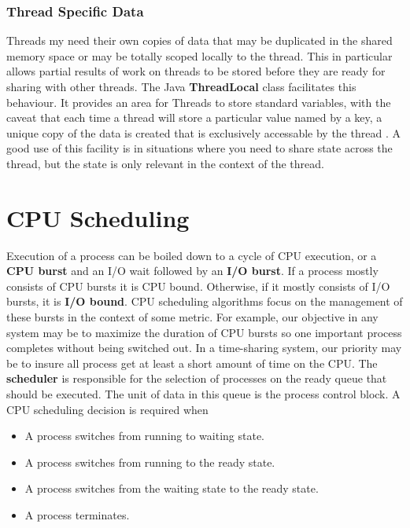 \documentclass[10pt,a4paper]{article}
\begin{document}
\subsubsection{Thread Specific Data}
Threads my need their own copies of data that may be duplicated in the shared memory space or may be totally scoped locally to the thread. This in particular allows partial results of work on threads to be stored before they are ready for sharing with other threads. The Java {\bf ThreadLocal } class facilitates this behaviour. It provides an area for Threads to store standard variables, with the caveat that each time a thread will store a particular value named by a key, a unique copy of the data is created that is exclusively accessable by the thread \cite{threadlocal}. A good use of this facility is in situations where you need to share state across the thread, but the state is only relevant in the context of the thread.  
\section{CPU Scheduling}
Execution of a process can be boiled down to a cycle of CPU execution, or a {\bf CPU burst} and an I/O wait followed by an {\bf I/O burst}. If a process mostly consists of CPU bursts it is CPU bound. Otherwise, if it mostly consists of I/O bursts, it is {\bf I/O bound}. CPU scheduling algorithms focus on the management of these bursts in the context of some metric. For example, our objective in any system may be to maximize the duration of CPU bursts so one important process completes without being switched out. In a time-sharing system, our priority may be to insure all process get at least a short amount of time on the CPU. The {\bf scheduler} is responsible for the selection of processes on the ready queue that should be executed. The unit of data in this queue is the process control block. 
\newline\newline
A CPU scheduling decision is required when 
\begin{itemize}
\item A process switches from running to waiting state. 
\item A process switches from running to the ready state. 
\item A process switches from the waiting state to the ready state. 
\item A process terminates. 
\end{itemize}
\end{document}
